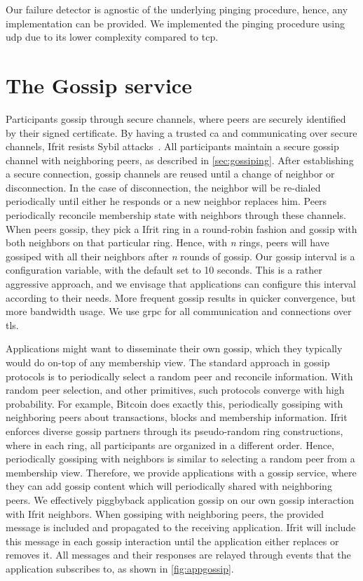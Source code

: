 \documentclass[USenglish]{uit-thesis}
\begin{document}
Our failure detector is agnostic of the underlying pinging procedure, hence, any implementation can be provided.
We implemented the pinging procedure using \gls{udp} due to its lower complexity compared to \gls{tcp}.




\section{The Gossip service}
Participants gossip through secure channels, where peers are securely identified by their signed certificate.
By having a trusted \gls{ca} and communicating over secure channels, Ifrit resists Sybil attacks~\cite{sybil}.
All participants maintain a secure gossip channel with neighboring peers, as described in \autoref{sec:gossiping}.
After establishing a secure connection, gossip channels are reused until a change of neighbor or disconnection.
In the case of disconnection, the neighbor will be re-dialed periodically until either he responds or a new neighbor replaces him.
Peers periodically reconcile membership state with neighbors through these channels.
When peers gossip, they pick a Ifrit ring in a round-robin fashion and gossip with both neighbors on that particular ring.
Hence, with \textit{n} rings, peers will have gossiped with all their neighbors after \textit{n} rounds of gossip.
Our gossip interval is a configuration variable, with the default set to 10 seconds.
This is a rather aggressive approach, and we envisage that applications can configure this interval according to their needs.
More frequent gossip results in quicker convergence, but more bandwidth usage. 
We use \gls{grpc} for all communication and connections over \gls{tls}.

Applications might want to disseminate their own gossip, which they typically would do on-top of any membership view.
The standard approach in gossip protocols is to periodically select a random peer and reconcile information.
With random peer selection, and other primitives, such protocols converge with high probability.
For example, Bitcoin \cite{bitcoin} does exactly this, periodically gossiping with neighboring peers about transactions, blocks and membership information.
Ifrit enforces diverse gossip partners through its pseudo-random ring constructions, where in each ring, all participants are organized in a different order.
Hence, periodically gossiping with neighbors is similar to selecting a random peer from a membership view.
Therefore, we provide applications with a gossip service, where they can add gossip content which will periodically shared with neighboring peers.    
We effectively piggbyback application gossip on our own gossip interaction with Ifrit neighbors.
When gossiping with neighboring peers, the provided message is included and propagated to the receiving application.
Ifrit will include this message in each gossip interaction until the application either replaces or removes it.
All messages and their responses are relayed through events that the application subscribes to, as shown in \autoref{fig:appgossip}.
\end{document}
